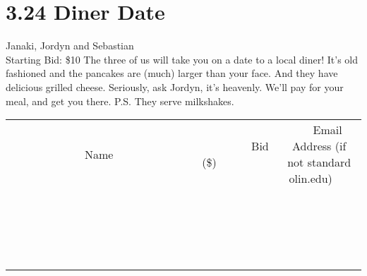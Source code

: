 \documentclass[11pt]{article}
\begin{document}
\section*{3.24 Diner Date}
Janaki, Jordyn and Sebastian
\\
Starting Bid: \$10
\newline
The three of us will take you on a date to a local diner! It's old fashioned and the pancakes are (much) larger than your face. And they have delicious grilled cheese. Seriously, ask Jordyn, it's heavenly. We'll pay for your meal, and get you there. P.S. They serve milkshakes.
\\[3ex]
\begin{tabular}{c c c}
~~~~~~~~~~~~~Name~~~~~~~~~~~~~ & ~~~~~~~~~Bid (\$)~~~~~~~~~  & ~~~Email Address (if not standard olin.edu)~~~\\
 & & \\
\hline
 & & \\
\hline
 & & \\
\hline
 & & \\
\hline
 & & \\
\hline
 & & \\
\hline
 & & \\
\hline
 & & \\
\hline
 & & \\
\hline
 & & \\
\hline
 & & \\
\hline
 & & \\
\hline
 & & \\
\hline
 & & \\
\hline
 & & \\
\hline
 & & \\
\hline
 & & \\
\hline
 & & \\
\hline
 & & \\
\hline
\end{tabular}
\newpage
\end{document}
